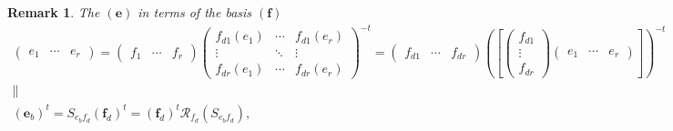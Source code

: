 \documentclass[aps,preprint]{revtex4}
\newtheorem{remark}[theorem]{Remark}
\begin{document}
\begin{remark}
The $\left( \boldsymbol{e}\right) $ in terms of the basis $\left( 
\boldsymbol{f}\right) $ 
\begin{gather}
\left( 
\begin{array}{ccc}
e_{1} & \cdots & e_{r}%
\end{array}%
\right) =\left( 
\begin{array}{ccc}
f_{1} & \cdots & f_{r}%
\end{array}%
\right) \left( 
\begin{array}{ccc}
f_{d1}\left( e_{1}\right) & \cdots & f_{d1}\left( e_{r}\right) \\ 
\vdots & \ddots & \vdots \\ 
f_{dr}\left( e_{1}\right) & \cdots & f_{dr}\left( e_{r}\right)%
\end{array}%
\right) ^{-t}=\left( 
\begin{array}{ccc}
f_{d1} & \cdots & f_{dr}%
\end{array}%
\right) \left( \left[ \left( 
\begin{array}{c}
f_{d1} \\ 
\vdots \\ 
f_{dr}%
\end{array}%
\right) \left( 
\begin{array}{ccc}
e_{1} & \cdots & e_{r}%
\end{array}%
\right) \right] \right) ^{-t} \\
\parallel \\
\left( \boldsymbol{e}_{b}\right) ^{t}=S_{e_{b}f_{d}}\left( \boldsymbol{f}%
_{d}\right) ^{t}=\left( \boldsymbol{f}_{d}\right) ^{t}\mathcal{R}%
_{f_{d}}\left( S_{e_{b}f_{d}}\right) ,
\end{gather}
\end{remark}
\end{document}

